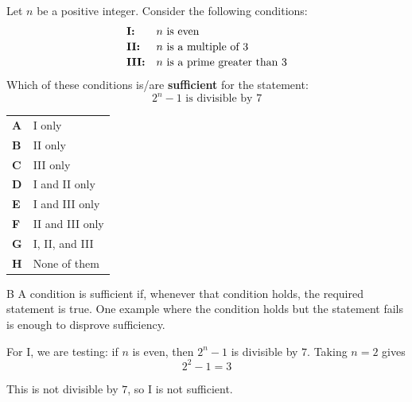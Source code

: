 \documentclass[11pt,a4paper]{article}
\begin{document}
\clearpage
\thispagestyle{djssolutions}
\vspace*{8pt}
\begin{enumerate}[label=\textbf{\arabic*.},leftmargin=*,itemsep=0pt,start=16]
\questionitem[Number]
Let $n$ be a positive integer. Consider the following conditions: \[ \begin{array}{@{}l l@{}}
\textbf{I:} & \text{$n$ is even} \\[2pt]
\textbf{II:} & \text{$n$ is a multiple of $3$} \\[2pt]
\textbf{III:} & \text{$n$ is a prime greater than $3$}
\end{array} \] Which of these conditions is/are \textbf{sufficient} for the statement: \[2^n-1 \text{ is divisible by }7\]

\par\vspace*{12pt}
\begin{tabularx}{\linewidth}{@{}>{\bfseries}l Y@{}}
A &
I only
\\[0.8em]
B &
II only
\\[0.8em]
C &
III only
\\[0.8em]
D &
I and II only
\\[0.8em]
E &
I and III only
\\[0.8em]
F &
II and III only
\\[0.8em]
G &
I, II, and III
\\[0.8em]
H &
None of them
\\
\end{tabularx}

\begin{djsSolution}{B}
A condition is sufficient if, whenever that condition holds, the required statement is true. One example where the condition holds but the statement fails is enough to disprove sufficiency.

For I, we are testing: if $n$ is even, then $2^n-1$ is divisible by $7$. Taking $n=2$ gives
\[
2^2-1=3
\]

This is not divisible by $7$, so I is not sufficient.


\end{djsSolution}
\end{enumerate}
\end{document}
